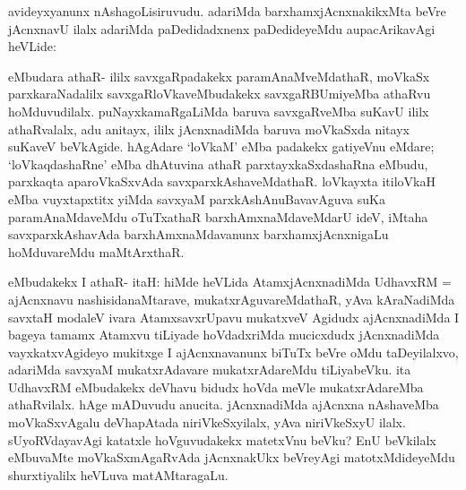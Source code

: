 \begin{artha}
avideyxyanunx nAshagoLisiruvudu. adariMda barxhamxjAcnxnakikxMta beVre jAcnxnavU ilalx adariMda paDedidadxnenx paDedideyeMdu aupacArikavAgi heVLide:
\end{artha}


\begin{artha}
eMbudara athaR- ililx savxgaRpadakekx paramAnaMveMdathaR, moVkaSx parxkaraNadalilx savxgaRloVkaveMbudakekx savxgaRBUmiyeMba athaRvu hoMduvudilalx. puNayxkamaRgaLiMda baruva savxgaRveMba suKavU ililx athaRvalalx, adu anitayx, ililx jAcnxnadiMda baruva moVkaSxda nitayx suKaveV beVkAgide. hAgAdare `loVkaM' eMba padakekx gatiyeVnu eMdare; `loVkaqdashaRne' eMba dhAtuvina athaR parxtayxkaSxdashaRna eMbudu, parxkaqta aparoVkaSxvAda savxparxkAshaveMdathaR. loVkayxta itiloVkaH eMba vuyxtapxtitx yiMda savxyaM parxkAshAnuBavavAguva suKa paramAnaMdaveMdu oTuTxathaR barxhAmxnaMdaveMdarU ideV, iMtaha savxparxkAshavAda barxhAmxnaMdavanunx barxhamxjAcnxnigaLu hoMduvareMdu maMtArxthaR. 
\end{artha}


\begin{artha}
eMbudakekx I athaR- itaH: hiMde heVLida AtamxjAcnxnadiMda UdhavxRM = ajAcnxnavu nashisidanaMtarave, mukatxrAguvareMdathaR, yAva kAraNadiMda savxtaH modaleV ivara AtamxsavxrUpavu mukatxveV Agidudx ajAcnxnadiMda I bageya tamamx Atamxvu tiLiyade hoVdadxriMda mucicxdudx jAcnxnadiMda vayxkatxvAgideyo mukitxge I ajAcnxnavanunx biTuTx beVre oMdu taDeyilalxvo, adariMda savxyaM mukatxrAdavare mukatxrAdareMdu tiLiyabeVku. ita UdhavxRM eMbudakekx deVhavu bidudx hoVda meVle mukatxrAdareMba athaRvilalx. hAge mADuvudu anucita. jAcnxnadiMda ajAcnxna nAshaveMba moVkaSxvAgalu deVhapAtada niriVkeSxyilalx, yAva niriVkeSxyU ilalx. sUyoRVdayavAgi katatxle hoVguvudakekx matetxVnu beVku? EnU beVkilalx eMbuvaMte moVkaSxmAgaRvAda jAcnxnakUkx beVreyAgi matotxMdideyeMdu shurxtiyalilx \ndash  heVLuva matAMtaragaLu.
\end{artha}


